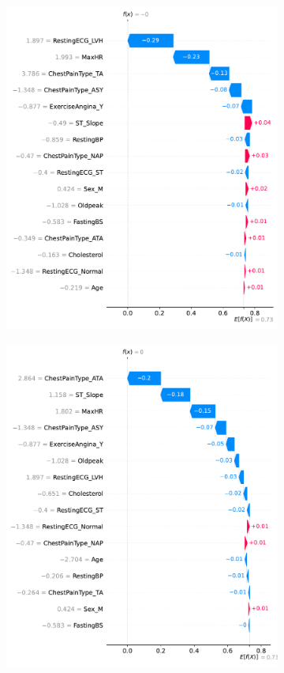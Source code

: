 \begin{figure}
    \centering
    \begin{subfigure}{1\columnwidth}
        \includegraphics[width=1\textwidth]{images/shap_sample_negative_1.pdf}
        \caption{}
    \end{subfigure}
    \begin{subfigure}{1\columnwidth}
        \includegraphics[width=1\textwidth]{images/shap_sample_negative_2.pdf}

\end{subfigure}
\end{figure}

